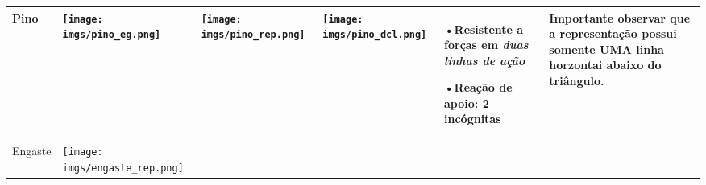 \documentclass{article}
\begin{document}
\begin{table}[h]
\begin{tabularx}{\textwidth}{|l|X|X|X|l|l|}
                        Pino & 
    
                            \begin{minipage}{.2\textwidth}
                                \centering
                                \texttt{[image: imgs/pino\_eg.png]}
                            \end{minipage} &
    
                            \begin{minipage}{.2\columnwidth}
                                \centering
                                \texttt{[image: imgs/pino\_rep.png]}
                            \end{minipage} &
    
                            \begin{minipage}{.2\columnwidth}
                                \centering
                                \texttt{[image: imgs/pino\_dcl.png]}
                            \end{minipage} &
    
                            \begin{minipage}{.1\columnwidth}
                                \tiny
                                •Resistente a forças em \emph{duas linhas de ação}
    
                                •Reação de apoio: 2 incógnitas
                            \end{minipage}&
    
                            \begin{minipage}{.1\columnwidth}
                                \vspace{5px}
                                \tiny
                                Importante observar que a representação possui somente \textbf{UMA} linha horzontai abaixo do triângulo.
                                \vspace{5px}
                            \end{minipage} \\ \hline
    
    
                            Engaste & 
    
                                \begin{minipage}{.2\textwidth}
                                    \centering
                                    \texttt{[image: imgs/engaste\_rep.png]}
                                \end{minipage} &
    

\end{tabularx}
\end{table}
\end{document}
